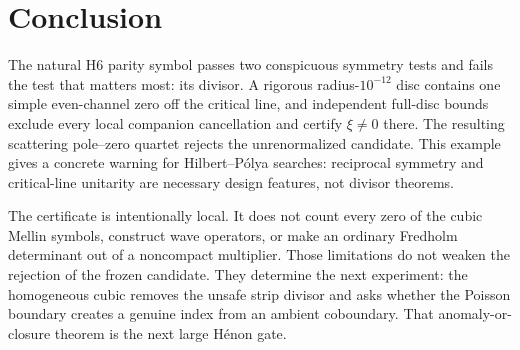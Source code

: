 \section{Conclusion}

The natural H6 parity symbol passes two conspicuous symmetry tests and fails
the test that matters most: its divisor. A rigorous radius-$10^{-12}$ disc
contains one simple even-channel zero off the critical line, and independent
full-disc bounds exclude every local companion cancellation and certify
\(\xi\neq0\) there. The resulting scattering pole--zero quartet rejects the
unrenormalized candidate. This
example gives a concrete warning for Hilbert--P\'olya searches: reciprocal
symmetry and critical-line unitarity are necessary design features, not
divisor theorems.

The certificate is intentionally local. It does not count every zero of the
cubic Mellin symbols, construct wave operators, or make an ordinary
Fredholm determinant out of a noncompact multiplier. Those limitations do
not weaken the rejection of the frozen candidate. They determine the next
experiment: the homogeneous cubic removes the unsafe strip divisor and asks
whether the Poisson boundary creates a genuine index from an ambient
coboundary. That anomaly-or-closure theorem is the next large H\'enon gate.
